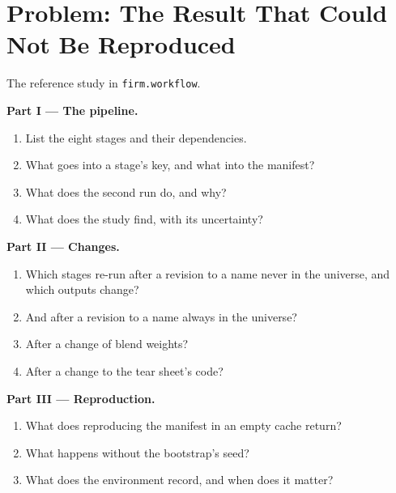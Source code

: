 \section{Problem: The Result That Could Not Be Reproduced}

\begin{problem}\label{pb:rs:build-a-research-workflow:1}
The reference study in \texttt{firm.workflow}.

\medskip\noindent\textbf{Part I --- The pipeline.}
\begin{enumerate}
\item List the eight stages and their dependencies.
\item What goes into a stage's key, and what into the manifest?
\item What does the second run do, and why?
\item What does the study find, with its uncertainty?
\end{enumerate}

\medskip\noindent\textbf{Part II --- Changes.}
\begin{enumerate}[resume]
\item Which stages re-run after a revision to a name never in the universe, and which outputs change?
\item And after a revision to a name always in the universe?
\item After a change of blend weights?
\item After a change to the tear sheet's code?
\end{enumerate}

\medskip\noindent\textbf{Part III --- Reproduction.}
\begin{enumerate}[resume]
\item What does reproducing the manifest in an empty cache return?
\item What happens without the bootstrap's seed?
\item What does the environment record, and when does it matter?
\end{enumerate}


\end{problem}
